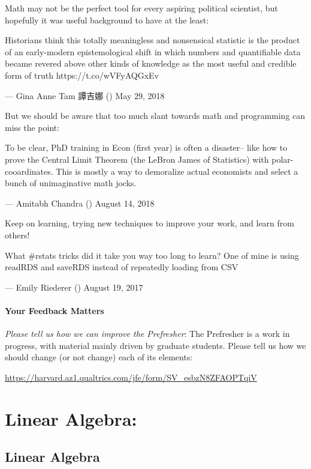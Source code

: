 \documentclass[
]{book}
\theoremstyle{definition}
\theoremstyle{definition}
\theoremstyle{definition}
\theoremstyle{definition}
\theoremstyle{remark}
\begin{document}
Math may not be the perfect tool for every aspiring political scientist, but hopefully it was useful background to have at the least:

Historians think this totally meaningless and nonsensical statistic is the product of an early-modern epistemological shift in which numbers and quantifiable data became revered above other kinds of knowledge as the most useful and credible form of truth https://t.co/wVFyAQGxEv

--- Gina Anne Tam 譚吉娜 (\citet{DGTam86}) May 29, 2018

But we should be aware that too much slant towards math and programming can miss the point:

To be clear, PhD training in Econ (first year) is often a disaster-- like how to prove the Central Limit Theorem (the LeBron James of Statistics) with polar-cooardinates. This is mostly a way to demoralize actual economists and select a bunch of unimaginative math jocks.

--- Amitabh Chandra (\citet{amitabhchandra2}) August 14, 2018

Keep on learning, trying new techniques to improve your work, and learn from others!

What \#rstats tricks did it take you way too long to learn? One of mine is using readRDS and saveRDS instead of repeatedly loading from CSV

--- Emily Riederer (\citet{EmilyRiederer}) August 19, 2017

\hypertarget{your-feedback-matters}{%
\subsection*{Your Feedback Matters}\label{your-feedback-matters}}

\emph{Please tell us how we can improve the Prefresher}: The Prefresher is a work in progress, with material mainly driven by graduate students. Please tell us how we should change (or not change) each of its elements:

\url{https://harvard.az1.qualtrics.com/jfe/form/SV_esbzN8ZFAOPTqiV}

\hypertarget{part-linear-algebra}{%
\part{Linear Algebra:}\label{part-linear-algebra}}

\hypertarget{linearalgebra}{%
\chapter{Linear Algebra}\label{linearalgebra}}
\end{document}

